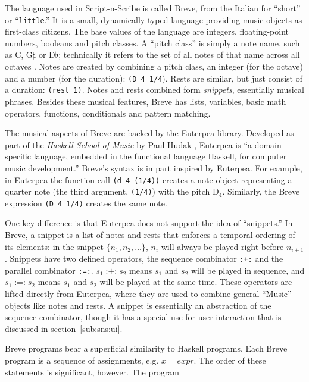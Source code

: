 \documentclass[nocopyrightspace,numbers,10pt]{sigplanconf}
\newcommand{\lil}{\texttt{little}}
\newcommand{\sns}{Script-n-Scribe}
\DeclareMathOperator{\parop}{:=:}
\DeclareMathOperator{\seqop}{:+:}
\begin{document}
The language used in \sns{} is called Breve, from the Italian for ``short'' or
``\lil.'' It is a small, dynamically-typed language providing music objects as
first-class citizens. The base values of the language are integers,
floating-point numbers, booleans and pitch classes. A ``pitch class'' is simply
a note name, such as C, G$\sharp$ or D$\flat$; technically it refers to the set
of all notes of that name across all octaves \cite{oxfordPC}. Notes are created
by combining a pitch class, an integer (for the octave) and a number (for the
duration): \texttt{(D 4 1/4}). Rests are similar, but just consist of a
duration: \texttt{(rest 1)}. Notes and rests combined form \emph{snippets},
essentially musical phrases. Besides these musical features, Breve has lists,
variables, basic math operators, functions, conditionals and pattern matching.

The musical aspects of Breve are backed by the Euterpea \cite{eut} library.
Developed as part of the \emph{Haskell School of Music} by Paul Hudak
\cite{HSoM}, Euterpea is ``a domain-specific language, embedded in the
functional language Haskell, for computer music development.'' Breve's syntax is
in part inspired by Euterpea. For example, in Euterpea the function call
\texttt{(d 4 (1/4))} creates a note object representing a quarter note (the
third argument, \texttt{(1/4)}) with the pitch D$_4$. Similarly, the Breve
expression \texttt{(D 4 1/4)} creates the same note.

One key difference is that Euterpea does not support the idea of ``snippets.''
In Breve, a snippet is a list of notes and rests that enforces a temporal
ordering of its elements: in the snippet $\{n_1,n_2,\dots\}$, $n_i$ will always
be played right before $n_{i+1}$. Snippets have two defined operators, the
sequence combinator \texttt{:+:} and the parallel combinator \texttt{:=:}. $s_1
\seqop s_2$ means $s_1$ and $s_2$ will be played in sequence, and $s_1 \parop
s_2$ means $s_1$ and $s_2$ will be played at the same time. These operators are
lifted directly from Euterpea, where they are used to combine general ``Music''
objects like notes and rests. A snippet is essentially an abstraction of the
sequence combinator, though it has a special use for user interaction that is
discussed in section~\ref{sub:sns:ui}.

Breve programs bear a superficial similarity to Haskell programs. Each Breve
program is a sequence of assignments, e.g. $x = expr$. The order of these
statements is significant, however. The program
\end{document}
